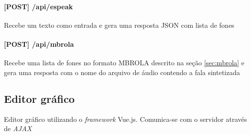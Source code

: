 \paragraph{[POST] /api/espeak} Recebe um texto como entrada e gera uma resposta
JSON com lista de fones
\paragraph{[POST] /api/mbrola} Recebe uma lista de fones no formato MBROLA
descrito na seção \ref{sec:mbrola} e gera uma resposta com o nome do arquivo de
áudio contendo a fala sintetizada

\subsection{Editor gráfico}
Editor gráfico utilizando o \emph{framework} Vue.js. Comunica-se com o servidor
através de \emph{AJAX}

%         
%         
%     
%     
%     
%     
%     
%         

